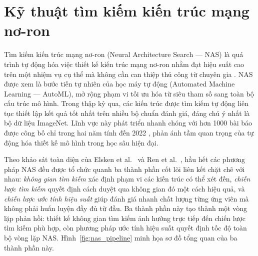 \section{Kỹ thuật tìm kiếm kiến trúc mạng nơ-ron}
\label{sec:nas}

Tìm kiếm kiến trúc mạng nơ-ron (Neural Architecture Search — NAS) là quá trình tự động hóa việc thiết kế kiến trúc mạng nơ-ron nhằm đạt hiệu suất cao trên một nhiệm vụ cụ thể mà không cần can thiệp thủ công từ chuyên gia \cite{white2023_nas1000}. NAS được xem là bước tiến tự nhiên của học máy tự động (Automated Machine Learning — AutoML), mở rộng phạm vi tối ưu hóa từ siêu tham số sang toàn bộ cấu trúc mô hình. Trong thập kỷ qua, các kiến trúc được tìm kiếm tự động liên tục thiết lập kết quả tốt nhất trên nhiều bộ chuẩn đánh giá, đáng chú ý nhất là bộ dữ liệu ImageNet. Lĩnh vực này phát triển nhanh chóng với hơn 1000 bài báo được công bố chỉ trong hai năm tính đến 2022 \cite{white2023_nas1000}, phản ánh tầm quan trọng của tự động hóa thiết kế mô hình trong học sâu hiện đại.

Theo khảo sát toàn diện của Elsken et al.\ \cite{elsken2018_nas_survey} và Ren et al.\ \cite{ren2020_nas_survey}, hầu hết các phương pháp NAS đều được tổ chức quanh ba thành phần cốt lõi liên kết chặt chẽ với nhau: \textit{không gian tìm kiếm} xác định phạm vi các kiến trúc có thể xét đến, \textit{chiến lược tìm kiếm} quyết định cách duyệt qua không gian đó một cách hiệu quả, và \textit{chiến lược ước tính hiệu suất} giúp đánh giá nhanh chất lượng từng ứng viên mà không phải huấn luyện đầy đủ từ đầu. Ba thành phần này tạo thành một vòng lặp phản hồi: thiết kế không gian tìm kiếm ảnh hưởng trực tiếp đến chiến lược tìm kiếm phù hợp, còn phương pháp ước tính hiệu suất quyết định tốc độ toàn bộ vòng lặp NAS. Hình~\ref{fig:nas_pipeline} minh họa sơ đồ tổng quan của ba thành phần này.


